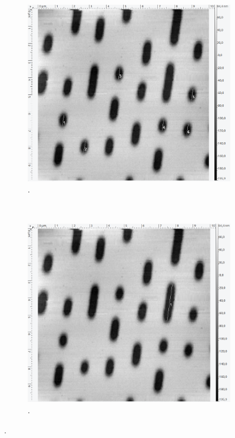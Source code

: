 \begin{figure}[H]
\begin{subfigure}[t]{0.4\textwidth}
	\label{abb:}
	\end{subfigure}
	\\
	\begin{subfigure}[t]{0.4\textwidth}
	\includegraphics[width=\textwidth]{AFM_auswertung/cd_Lmin.png}
	\caption{.}
	\label{abb:}
	\end{subfigure}
	~
	\begin{subfigure}[t]{0.4\textwidth}
	\includegraphics[width=\textwidth]{AFM_auswertung/cd_Lmax.png}
	\caption{.}
	\label{abb:}
	\end{subfigure}
\caption{.}
\label{abb:CD}
\end{figure}

